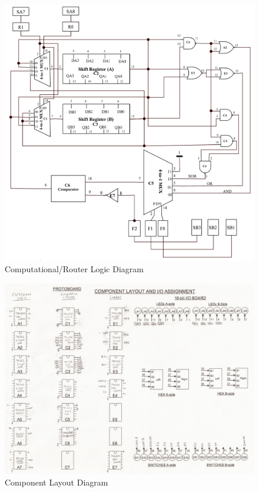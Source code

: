 \documentclass[journal, twocolumn, final,11pt,letterpaper]{IEEEtran}
\begin{document}
\begin{figure} [H]
 	\centering
 	\includegraphics[scale=0.55]{Computational_Router_Logic.png}
 	\caption{Computational/Router Logic Diagram\label{fig:computational-router-logic-diagram}}
\end{figure}

\begin{figure} [H]
	\centering
	\includegraphics[scale=0.55]{Component_Layout.png}
	\caption{Component Layout Diagram\label{fig:component-layout}}
\end{figure}



\end{document}
